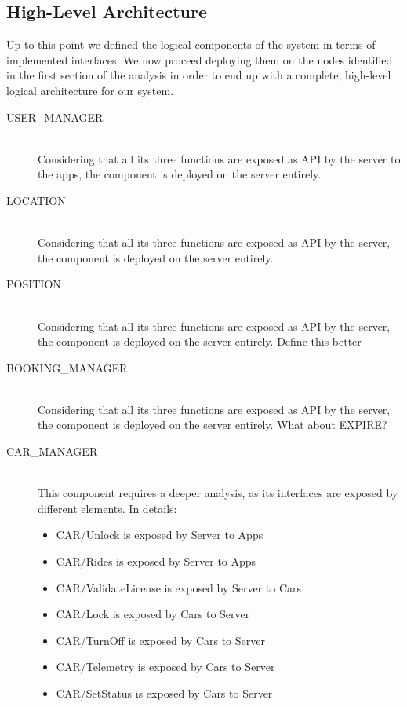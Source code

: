 \documentclass[11pt]{article} %
\begin{document}
\subsection{High-Level Architecture}

Up to this point we defined the logical components of the system in terms of implemented interfaces. We now proceed deploying them on the nodes identified in the first section of the analysis in order to end up with a complete, high-level logical architecture for our system.


\begin{description}
	\item[USER\_MANAGER] \hfill \\
	Considering that all its three functions are exposed as API by the server to the apps, the component is deployed on the server entirely.
		
	\item[LOCATION] \hfill \\
	Considering that all its three functions are exposed as API by the server, the component is deployed on the server entirely.

	\item[POSITION] \hfill \\
	Considering that all its three functions are exposed as API by the server, the component is deployed on the server entirely. {\color{red} {Define this better}}
	
	\item[BOOKING\_MANAGER] \hfill \\
	Considering that all its three functions are exposed as API by the server, the component is deployed on the server entirely. {\color{red} {What about EXPIRE?}}
	
	\item[CAR\_MANAGER] \hfill \\
	This component requires a deeper analysis, as its interfaces are exposed by different elements. In details:
	\begin{itemize}
		\item CAR/Unlock is exposed by Server to Apps
		\item CAR/Rides is exposed by Server to Apps
		\item CAR/ValidateLicense is exposed by Server to Cars
		\item CAR/Lock is exposed by Cars to Server
		\item CAR/TurnOff is exposed by Cars to Server
		\item CAR/Telemetry is exposed by Cars to Server
		\item CAR/SetStatus is exposed by Cars to Server
	\end{itemize}
\end{description}
	
\end{document}
